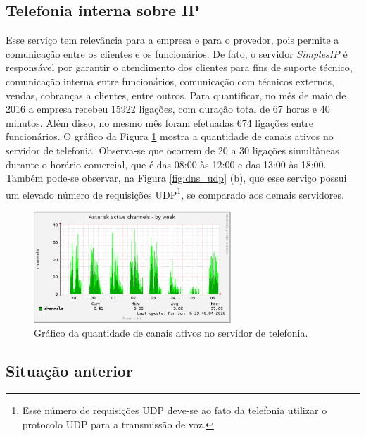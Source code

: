 \subsection{Telefonia interna sobre IP}
\label{section:telefonia}

Esse serviço tem relevância para a empresa e para o provedor, pois permite a comunicação entre os clientes e os funcionários. De fato, o 
servidor \textit{SimplesIP} é responsável por garantir o atendimento dos clientes para fins de suporte técnico, comunicação interna entre 
funcionários, comunicação com técnicos externos, vendas, cobranças a clientes, entre outros. Para quantificar, no mês de maio de 2016 a empresa 
recebeu 15922 ligações, com duração total de 67 horas e 40 minutos. Além disso, no mesmo mês foram efetuadas 674 ligações entre funcionários. 
O gráfico da Figura \ref{fig:simplesip_week} mostra a quantidade de canais ativos no servidor de telefonia. Observa-se que ocorrem 
de 20 a 30 ligações simultâneas durante o horário comercial, que é das 08:00 às 12:00 e das 13:00 às 18:00. Também pode-se observar, na Figura 
\ref{fig:dns_udp} (b), que esse serviço possui um elevado número de requisições \ac{UDP}\footnote[2]{Esse número de requisições \ac{UDP} 
deve-se ao fato da telefonia utilizar o protocolo \ac{UDP} para a transmissão de voz.}, se comparado aos demais servidores.

\begin{figure}[h!]
 \centering
 \includegraphics[width=280px]{img/simplesip_week.eps}
 \caption{Gráfico da quantidade de canais ativos no servidor de telefonia.}
 \label{fig:simplesip_week}
\end{figure}

\subsection{Situação anterior}
\label{section:maqservcrit}

